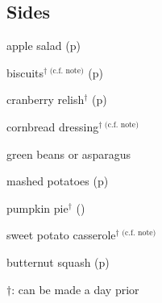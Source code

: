 \documentclass[oneside]{book}  %
\begin{document}
\subsection{Sides}
\begin{twocols} \begin{ingredientslist}
  \item apple salad (p\pageref{recipe:apple_salad})
  \item biscuits$^{\dagger \text{ (c.f.\ note)}}$ (p\pageref{recipe:baking_powder_biscuits})
  \item cranberry relish$^\dagger$ (p\pageref{recipe:cranberry_relish})
  \item cornbread dressing$^{\dagger \text{ (c.f.\ note)}}$
  \item green beans or asparagus
  \item mashed potatoes (p\pageref{recipe:mashed_potatoes})
  \item pumpkin pie$^\dagger$ (\CICookbook[720])
  \item sweet potato casserole$^{\dagger \text{ (c.f.\ note)}}$ \todo[reference?]
  \item butternut squash (p\pageref{recipe:braised_butternut_squash})
\end{ingredientslist} \end{twocols}
\noindent $\dagger$: can be made a day prior
\end{document}
